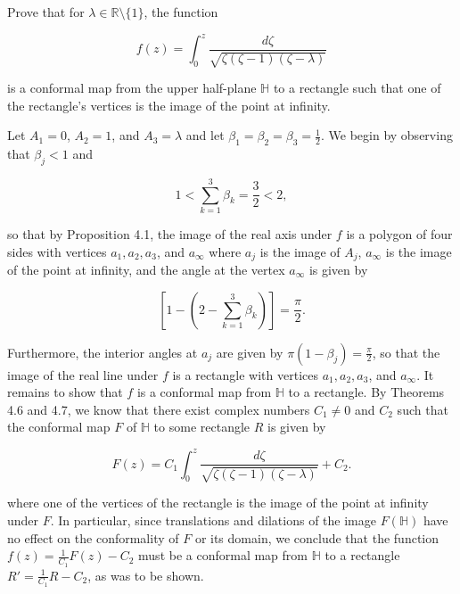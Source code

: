 Prove that for $\lambda \in \mathbb{R} \setminus \{1\}$, the function

$$
f(z) = \int_0^z \frac{d\zeta}{\sqrt{\zeta (\zeta - 1)(\zeta - \lambda)}}
$$

is a conformal map from the upper half-plane $\mathbb{H}$ to a rectangle such that one of the rectangle's vertices is 
the image of the point at infinity.

\begin{solution} 
  Let $A_1 = 0$, $A_2 = 1$, and $A_3 = \lambda$ and let $\beta_1 = \beta_2 = \beta_3 = \frac{1}{2}$. We begin by 
  observing that $\beta_j < 1$ and

  $$
  1 < \sum_{k=1}^{3} \beta_k = \frac{3}{2} < 2,
  $$

  so that by Proposition 4.1, the image of the real axis under $f$ is a polygon of four sides with vertices 
  $a_1, a_2, a_3$, and $a_{\infty}$ where $a_j$ is the image of $A_j$, $a_{\infty}$ is the image of the point at 
  infinity, and the angle at the vertex $a_{\infty}$ is given by 
  
  $$
    \left[1 - \left(2 - \sum\limits_{k = 1}^3 \beta_k \right) \right] = \frac{\pi}{2}.
  $$

  Furthermore, the interior angles at $a_j$ are given by $\pi (1 - \beta_j) = \frac{\pi}{2}$, so that the image of the 
  real line under $f$ is a rectangle with vertices $a_1, a_2, a_3$, and $a_{\infty}$. It remains to show that $f$ is a 
  conformal map from $\mathbb{H}$ to a rectangle. By Theorems 4.6 and 4.7, we know that there exist complex numbers 
  $C_1 \neq 0$ and $C_2$ such that the conformal map $F$ of $\mathbb{H}$ to some rectangle $R$ is given by

  $$
  F(z) = C_1 \int_0^z \frac{d\zeta}{\sqrt{\zeta(\zeta - 1)(\zeta - \lambda)}} + C_2.
  $$

  where one of the vertices of the rectangle is the image of the point at infinity under $F$. In particular, since 
  translations and dilations of the image $F(\mathbb{H})$ have no effect on the conformality of $F$ or its domain, we 
  conclude that the function $f(z) = \frac{1}{C_1} F(z) - C_2$ must be a conformal map from $\mathbb{H}$ to a rectangle
  $R' = \frac{1}{C_1} R - C_2$, as was to be shown.
  
  \ \\
\end{solution}